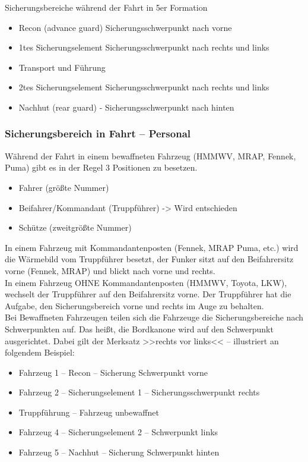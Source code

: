Sicherungsbereiche während der Fahrt in 5er Formation

	\begin{itemize}
		\item Recon (advance guard) Sicherungsschwerpunkt nach vorne
		\item 1tes Sicherungselement Sicherungsschwerpunkt nach rechts und links
		\item Transport und Führung  
		\item 2tes Sicherungselement Sicherungsschwerpunkt nach rechts und links
		\item Nachhut (rear guard) - Sicherungsschwerpunkt nach hinten
	\end{itemize}

\subsubsection{Sicherungsbereich in Fahrt – Personal}
	Während der Fahrt in einem bewaffneten Fahrzeug (HMMWV, MRAP, Fennek, Puma) gibt es in der Regel 3 Positionen zu besetzen.

	\begin{itemize}
		\item Fahrer (größte Nummer)
		\item Beifahrer/Kommandant (Truppführer) -> Wird entschieden
		\item Schütze (zweitgrößte Nummer)
	\end{itemize}

	In einem Fahrzeug mit Kommandantenposten (Fennek, MRAP Puma, etc.) wird die Wärmebild vom Truppführer besetzt, der Funker sitzt auf den Beifahrersitz vorne (Fennek, MRAP) und blickt nach vorne und rechts. \\
	In einem Fahrzeug OHNE Kommandantenposten (HMMWV, Toyota, LKW), wechselt der Truppführer auf den Beifahrersitz vorne. Der Truppführer hat die Aufgabe, den Sicherungsbereich vorne und rechts im Auge zu behalten. \\
	Bei Bewaffneten Fahrzeugen teilen sich die Fahrzeuge die Sicherungsbereiche nach Schwerpunkten auf. Das heißt, die Bordkanone wird auf den Schwerpunkt ausgerichtet. Dabei gilt der Merksatz >>rechts vor links<< – illustriert an folgendem Beispiel: 

	\begin{itemize}
		\item Fahrzeug 1 – Recon – Sicherung Schwerpunkt vorne
		\item Fahrzeug 2 – Sicherungselement 1 – Sicherungsschwerpunkt rechts
		\item Truppführung – Fahrzeug unbewaffnet
		\item Fahrzeug 4 – Sicherungselement 2 – Schwerpunkt links
		\item Fahrzeug 5 – Nachhut – Sicherung Schwerpunkt hinten
	\end{itemize}


